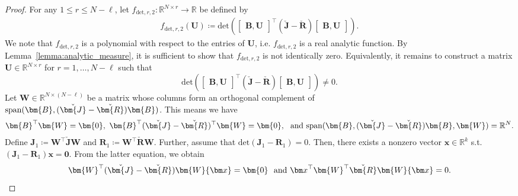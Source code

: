 \documentclass{article}
\newcommand{\bmU}{\bm{U}}
\newcommand{\bmW}{\bm{W}}
\newcommand{\bmJ}{\bm{J}}
\newcommand{\bmR}{\bm{R}}
\newcommand{\bmB}{\bm{B}}
\newcommand{\R}{\mathbb{R}}
\newcommand{\statex}{{\bm x}}
\newcommand{\bzero}{\mathbf{0}}
\newcommand{\FOMsize}{N}
\newcommand{\ROMsize}{r}
\newcommand{\Jcheck}{\check{\bmJ}}
\newcommand{\Rcheck}{\check{\bmR}}
\begin{document}
\begin{proof}
For any $1\le\ROMsize\leq \FOMsize-\ell$, let $f_{\mathrm{det},\ROMsize,2}\colon\R^{\FOMsize\times\ROMsize}\rightarrow \R$ be defined by 
			\begin{align*}
				f_{\mathrm{det},\ROMsize,2}(\bmU)\coloneq \mathrm{det}\left(\begin{bmatrix} \bmB,\bmU \end{bmatrix}^{\top} \left(\Jcheck-\Rcheck\right) \begin{bmatrix} \bmB,\bmU \end{bmatrix}\right).
			\end{align*}
We note that $f_{\mathrm{det},\ROMsize,2}$ is a polynomial with respect to the entries of $\bmU$, i.e. $f_{\mathrm{det},\ROMsize,2}$ is a real analytic function. By Lemma~\ref{lemma:analytic_measure}, it is sufficient to show that $f_{\mathrm{det},\ROMsize,2}$ is not identically zero. Equivalently, it remains to construct a matrix  $ \bmU\in\R^{\FOMsize\times \ROMsize} $ for $\ROMsize=1,\ldots,\FOMsize-\ell$ such that
			\begin{equation*}
				\mathrm{det}\left(\begin{bmatrix} \bmB,\bmU \end{bmatrix}^{\top} \left(\Jcheck-\Rcheck\right) \begin{bmatrix} \bmB,\bmU \end{bmatrix}\right) \neq 0. 
\end{equation*}
Let $\bmW\in\R^{\FOMsize\times(\FOMsize-\ell)}$ be a matrix whose columns form an orthogonal complement of \\$\textnormal{span}(\bmB,(\Jcheck-\Rcheck)\bmB)$. 
			This means we have 
			\begin{align}
				\label{equ:exists_JR_inv_BVbar_orth_comp}
				\bmB^\top\bmW = \bm{0},\
				\bmB^\top (\Jcheck-\Rcheck)^\top \bmW = \bm{0},\ \textnormal{ and }
				\mathrm{span}(
					\bmB, (\Jcheck-\Rcheck)\bmB, \bmW
				) =\R^{\FOMsize}.
			\end{align}
			Define
			$
			\bmJ_1 \coloneq  \bmW^{\top}\Jcheck\bmW$ and
			$\bmR_1 \coloneq  \bmW^{\top}\Rcheck\bmW.
			$
			Further, assume that $\mathrm{det}(\bmJ_1-\bmR_1)= 0$. Then, there exists a nonzero vector $\statex\in\R^k$ s.t.
				$(\bmJ_1-\bmR_1)\statex = \bzero$.
			From the latter equation, we obtain
			\begin{equation}
				\label{equ:GMG_exist_Orth_cond}
				\bmW^\top (\Jcheck-\Rcheck)\bmW\statex =\bm{0}\ \textnormal{ and }
				\statex^{\top}\bmW^{\top}\Rcheck\bmW\statex\allowbreak= 0.

\end{equation}
\end{proof}
\end{document}
